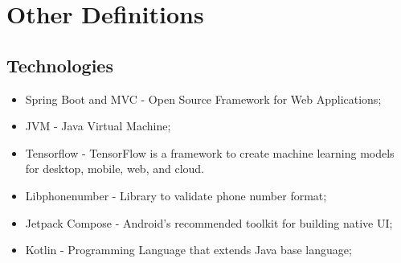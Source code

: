 \chapter{Other Definitions}
\label{app:AppendixA}



\section{Technologies}
\begin{itemize}
	\item Spring Boot and MVC - Open Source Framework for Web Applications;
	\item JVM - Java Virtual Machine;
    \item Tensorflow - TensorFlow is a framework to create machine learning models for desktop, mobile, web, and cloud.
	\item Libphonenumber - Library to validate phone number format;
	\item Jetpack Compose - Android’s recommended toolkit for building native UI;
	\item Kotlin - Programming Language that extends Java base language;
\end{itemize}
	